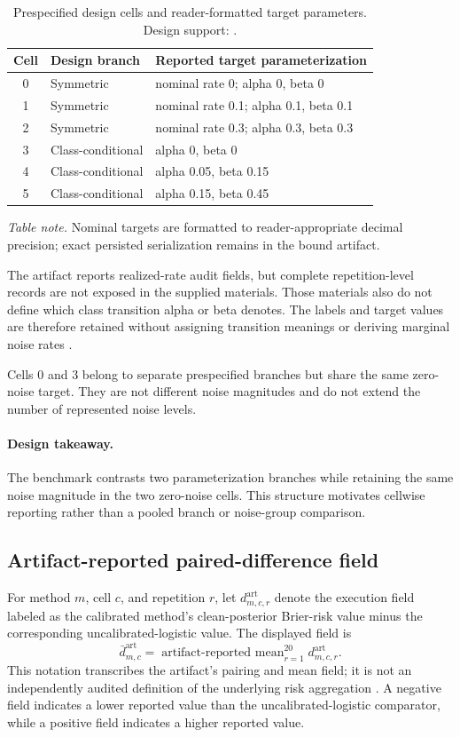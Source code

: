 \documentclass{article}
\begin{document}
\begin{table}[ht]
\centering
\caption{Prespecified design cells and reader-formatted target parameters. Design support: \cite{exec}.}
\begin{tabular}{cll}
\toprule
Cell & Design branch & Reported target parameterization\\
\midrule
0 & Symmetric & nominal rate 0; alpha 0, beta 0\\
1 & Symmetric & nominal rate 0.1; alpha 0.1, beta 0.1\\
2 & Symmetric & nominal rate 0.3; alpha 0.3, beta 0.3\\
3 & Class-conditional & alpha 0, beta 0\\
4 & Class-conditional & alpha 0.05, beta 0.15\\
5 & Class-conditional & alpha 0.15, beta 0.45\\
\bottomrule
\end{tabular}
\end{table}

\noindent\textit{Table note.} Nominal targets are formatted to reader-appropriate decimal precision; exact persisted serialization remains in the bound artifact.

The artifact reports realized-rate audit fields, but complete repetition-level records are not exposed in the supplied materials. Those materials also do not define which class transition alpha or beta denotes. The labels and target values are therefore retained without assigning transition meanings or deriving marginal noise rates \cite{exec}.

Cells 0 and 3 belong to separate prespecified branches but share the same zero-noise target. They are not different noise magnitudes and do not extend the number of represented noise levels.

\paragraph{Design takeaway.} The benchmark contrasts two parameterization branches while retaining the same noise magnitude in the two zero-noise cells. This structure motivates cellwise reporting rather than a pooled branch or noise-group comparison.

\subsection{Artifact-reported paired-difference field}
For method $m$, cell $c$, and repetition $r$, let $d^{\mathrm{art}}_{m,c,r}$ denote the execution field labeled as the calibrated method's clean-posterior Brier-risk value minus the corresponding uncalibrated-logistic value. The displayed field is
\[
\bar d^{\mathrm{art}}_{m,c}
= \operatorname{artifact\text{-}reported\ mean}_{r=1}^{20}
  d^{\mathrm{art}}_{m,c,r}.
\]
This notation transcribes the artifact's pairing and mean field; it is not an independently audited definition of the underlying risk aggregation \cite{exec}. A negative field indicates a lower reported value than the uncalibrated-logistic comparator, while a positive field indicates a higher reported value.
\end{document}
